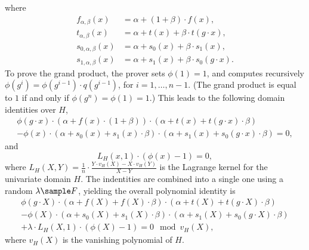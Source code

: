 \documentclass[11pt]{article}
\theoremstyle{definition}
\theoremstyle{remark}
\begin{document}
where
\begin{align*}
f_{\alpha,\beta} (x) &=\alpha +  (1+\beta)\cdot f(x),
\\
t_{\alpha, \beta}(x) &= \alpha + t(x) + \beta\cdot t(g\cdot x),
\\
s_{0,\alpha,\beta}(x) &= \alpha + s_0(x) + \beta\cdot s_1(x),
\\
s_{1,\alpha,\beta}(x) &=  \alpha + s_1(x) + \beta\cdot s_0(g\cdot x).
\end{align*}
To prove the grand product, the prover sets $\phi(1) = 1$, and computes recursively $\phi(g^i )= \phi(g^{i-1})\cdot q(g^{i-1})$, for $i=1,\ldots, n-1$.
(The grand product is equal to $1$ if and only if $\phi(g^n) = \phi(1) = 1$.)
This leads to the following domain identities over $H$,
\begin{multline}
\phi(g\cdot x) \cdot (\alpha + f(x)\cdot (1+\beta))\cdot (\alpha + t(x) + t(g\cdot x)\cdot \beta) 
\\
- \phi(x)\cdot (\alpha + s_0(x) + s_1(x)\cdot \beta)\cdot (\alpha + s_1(x) + s_0(g\cdot x)\cdot \beta)
= 0,
\end{multline}
and
\begin{equation}
L_H(x, 1)\cdot (\phi(x) - 1) = 0,
\end{equation}
where $L_H(X, Y) = \frac{1}{n}\cdot \frac{Y\cdot v_H(X) - X\cdot v_H(Y)}{X - Y}$ is the Lagrange kernel for the univariate domain $H$.
The indentities are combined into a single one using a random $\lambda \sample F$, yielding the overall polynomial identity is
\begin{multline*}
\phi(g\cdot X) \cdot (\alpha + f(X) + f(X)\cdot \beta)\cdot (\alpha + t(X) + t(g\cdot X)\cdot \beta) 
\\
- \phi(X) \cdot (\alpha + s_0(X) + s_1(X)\cdot \beta)\cdot (\alpha + s_1(X) + s_0(g\cdot X)\cdot \beta) 
\\
+  \lambda \cdot L_H(X, 1)\cdot (\phi(X) - 1) = 0  \mod v_H(X),
\end{multline*}
where $v_H(X)$ is the vanishing polynomial of $H$.
\end{document}
